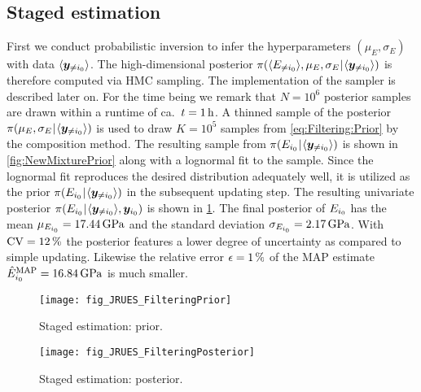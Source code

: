 \subsection{Staged estimation}
First we conduct probabilistic inversion to infer the hyperparameters \((\mu_E,\sigma_E)\) with data \(\langle{\bm{y}_{\neq i_0}}\rangle\).
The high-dimensional posterior \(\pi(\langle{E_{\neq i_0}}\rangle,\mu_E,\sigma_E {\:\!}|{\:\!} \langle{\bm{y}_{\neq i_0}}\rangle)\) is therefore computed via HMC sampling.
The implementation of the sampler is described later on.
For the time being we remark that \(N=10^6\) posterior samples are drawn within a runtime of ca.\ \(t = \unit[1]{h}\).
A thinned sample of the posterior \(\pi(\mu_E,\sigma_E {\:\!}|{\:\!} \langle{\bm{y}_{\neq i_0}}\rangle)\) is used to draw \(K=10^5\) samples from \cref{eq:Filtering:Prior} by the composition method.
The resulting sample from \(\pi(E_{i_0} {\:\!}|{\:\!} \langle{\bm{y}_{\neq i_0}}\rangle)\) is shown in \cref{fig:NewMixturePrior} along with a lognormal fit to the sample.
Since the lognormal fit reproduces the desired distribution adequately well, it is utilized as the prior \(\pi(E_{i_0} {\:\!}|{\:\!} \langle{\bm{y}_{\neq i_0}}\rangle)\) in the subsequent updating step.
The resulting univariate posterior \(\pi(E_{i_0} {\:\!}|{\:\!} \langle{\bm{y}_{\neq i_0}}\rangle,\bm{y}_{i_0})\) is shown in \cref{fig:SubsequentInversion}.
The final posterior of \(E_{i_0}\) has the mean \(\mu_{E_{\analyzed}} = \unit[17.44]{GPa}\) and the standard deviation \(\sigma_{E_{\analyzed}} = \unit[2.17]{GPa}\).
With \(\mathrm{CV} = \unit[12]{\%}\) the posterior features a lower degree of uncertainty as compared to simple updating.
Likewise the relative error \(\epsilon = \unit[1]{\%}\) of the MAP estimate \(\hat{E}_{\analyzed}^{\mathrm{MAP}} = \unit[16.84]{GPa}\) is much smaller.
\begin{figure}[ht]
  \begin{minipage}[b]{0.49\linewidth}
    \centering
    \texttt{[image: fig\_JRUES\_FilteringPrior]}
    \caption[Staged estimation: prior]{Staged estimation: prior.}
    \label{fig:NewMixturePrior}
  \end{minipage}%
  \hfill
  \begin{minipage}[b]{0.49\linewidth}
    \centering
    \texttt{[image: fig\_JRUES\_FilteringPosterior]}
    \caption[Staged estimation: posterior]{Staged estimation: posterior.}
    \label{fig:SubsequentInversion}
  \end{minipage}%
\end{figure}
